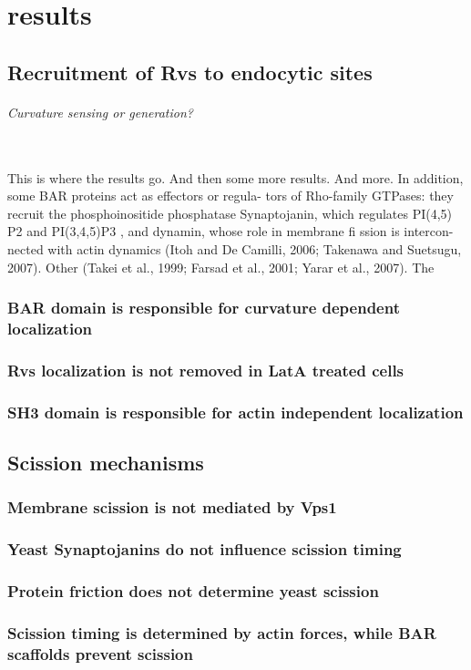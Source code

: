 \chapter{results}    \label{results}
\section{Recruitment of Rvs to endocytic sites}

	\subparagraph{Curvature sensing or generation? }
	\mbox{}\\
	This is where the results go. And then some more results. And more.
In addition, some BAR proteins act as effectors or regula- tors of Rho-family GTPases: they recruit the phosphoinositide phosphatase Synaptojanin, which regulates PI(4,5) P2
and PI(3,4,5)P3 , and dynamin, whose
role in membrane fi ssion is intercon- nected with actin dynamics (Itoh and De Camilli, 2006; Takenawa and Suetsugu,
2007). Other
(Takei et al., 1999; Farsad et al., 2001; Yarar et al., 2007). The

	\subsection{BAR domain is responsible for curvature dependent localization}
	\subsection{Rvs localization is not removed in LatA treated cells}
	\subsection{SH3 domain is responsible for actin independent  localization}
	
\section{Scission mechanisms}

\subsection{Membrane scission is not mediated by Vps1}
\subsection{Yeast Synaptojanins do not influence scission timing}
\subsection{Protein friction does not determine yeast scission }
\subsection{Scission timing is determined by actin forces, while BAR scaffolds prevent scission}